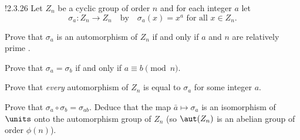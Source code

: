\begin{exercise}!{2.3.26}
    Let $Z_n$ be a cyclic group of order $n$ and for each integer $a$ let
    \[
    	\sigma_a \colon Z_n \to Z_n \quad \text{by} \quad \sigma_a(x) = x^a \text{ for all } x \in Z_n.
    \]
    \begin{subexercises}
        \item Prove that $\sigma_a$ is an automorphism of $Z_n$ if and only if $a$ and $n$ are relatively prime .
        \item Prove that $\sigma_a = \sigma_b$ if and only if $a \equiv b \pmod n$.
        \item Prove that \emph{every} automorphism of $Z_n$ is equal to $\sigma_a$ for some integer $a$.
        \item Prove that $\sigma_a \circ \sigma_b = \sigma_{ab}$.
	    Deduce that the map $\bar a \mapsto \sigma_a$ is an isomorphism of $\units$ onto the automorphism group of $Z_n$ (so $\aut(Z_n)$ is an abelian group of order $\phi(n)$).
    \end{subexercises}
\end{exercise}

